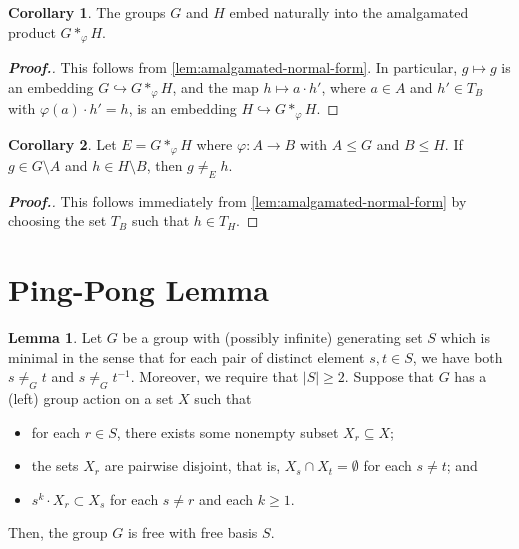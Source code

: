 \documentclass[11pt,a4paper,reqno]{amsart}
\theoremstyle{plain}
\theoremstyle{definition}
\newtheorem{lemma}[theorem]{Lemma}
\newtheorem{corollary}{Corollary}[theorem]
\theoremstyle{definition}
\renewcommand\leq\leqslant
\renewcommand\geq\geqslant
\newenvironment{myproof}{\begin{proof}[\normalfont\bfseries Proof.]}{\end{proof}}
\begin{document}
\begin{corollary}\label{cor:amal-natural-embed}
	The groups $G$ and $H$ embed naturally into the amalgamated product $G*_\varphi H$.
\end{corollary}

\begin{myproof}
  This follows from \cref{lem:amalgamated-normal-form}.
  In particular, $g\mapsto g$ is an embedding $G \hookrightarrow G*_\varphi H$, and
  the map $h\mapsto a\cdot h'$, where $a\in A$ and $h' \in T_B$ with $\varphi(a)\cdot h' =h$, is an embedding $H \hookrightarrow G*_\varphi H$.
\end{myproof}

\begin{corollary}\label{cor:unequal-values}
	Let $E = G *_\varphi H$ where $\varphi\colon A\to B$ with $A\leq G$ and $B \leq H$.
	If $g\in G\setminus A$ and $h \in H \setminus B$, then $g \neq_E h$.
\end{corollary}

\begin{myproof}
	This follows immediately from \cref{lem:amalgamated-normal-form} by choosing the set $T_B$ such that $h\in T_H$.
\end{myproof}

\section{Ping-Pong Lemma}

\begin{lemma}\label{lem:ping-pong}
	Let $G$ be a group with (possibly infinite) generating set $S$ which is minimal in the sense that for each pair of distinct element $s,t\in S$, we have both $s\neq_G t$ and $s \neq_G t^{-1}$.
	Moreover, we require that $|S|\geq 2$.
	Suppose that $G$ has a (left) group action on a set $X$ such that
	\begin{itemize}
		\item for each $r \in S$, there exists some nonempty subset $X_r\subseteq X$;
		\item the sets $X_r$ are pairwise disjoint, that is, $X_s\cap X_t = \emptyset$ for each $s\neq t$; and
		\item $s^k \cdot X_r \subset X_s$ for each $s \neq r$ and each $k \geq 1$.
	\end{itemize}
	Then, the group $G$ is free with free basis $S$.
\end{lemma}
\end{document}
